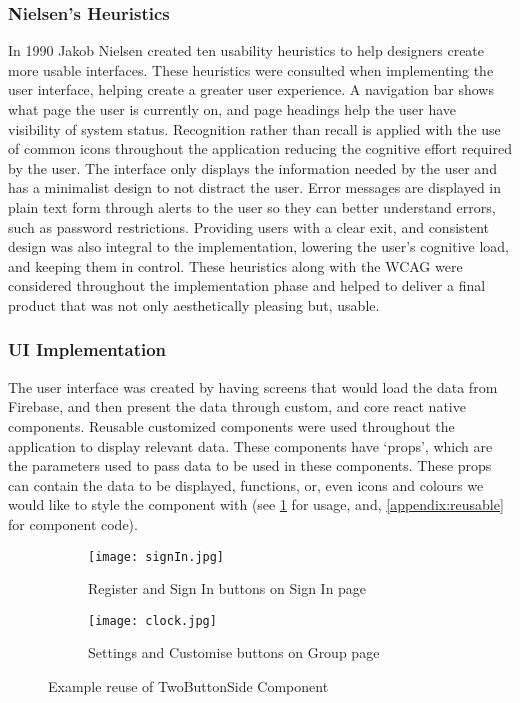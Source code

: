 \subsubsection{Nielsen's Heuristics }
In 1990 Jakob Nielsen created ten usability heuristics \cite{nielsen} to help designers create more usable interfaces. These heuristics were consulted when implementing the user interface, helping create a greater user experience. A navigation bar shows what page the user is currently on, and page headings help the user have visibility of system status. Recognition rather than recall is applied with the use of common icons throughout the application reducing the cognitive effort required by the user. The interface only displays the information needed by the user and has a minimalist design to not distract the user. Error messages are displayed in plain text form through alerts to the user so they can better understand errors, such as password restrictions. Providing users with a clear exit, and consistent design was also integral to the implementation, lowering the user's cognitive load, and keeping them in control. These heuristics along with the WCAG were considered throughout the implementation phase and helped to deliver a final product that was not only aesthetically pleasing but, usable.

\subsubsection{UI Implementation}
The user interface was created by having screens that would load the data from Firebase, and then present the data through custom, and core react native components. Reusable customized components were used throughout the application to display relevant data. These components have `props', which are the parameters used to pass data to be used in these components. These props can contain the data to be displayed, functions, or, even icons and colours we would like to style the component with (see \ref{fig:reuseComp} for usage, and, \ref{appendix:reusable} for component code).


\begin{figure}[!htbp]
    \centering
    \begin{subfigure}[b]{0.25\textwidth}
        \texttt{[image: signIn.jpg]}
        \caption{Register and Sign In buttons on Sign In page}
    \end{subfigure}
    \hspace{1.5em}
    \begin{subfigure}[b]{0.25\textwidth}
        \texttt{[image: clock.jpg]}
        \caption{Settings and Customise buttons on Group page}
    \end{subfigure}
    \caption{Example reuse of TwoButtonSide Component}
    \label{fig:reuseComp}
\end{figure}
\FloatBarrier
